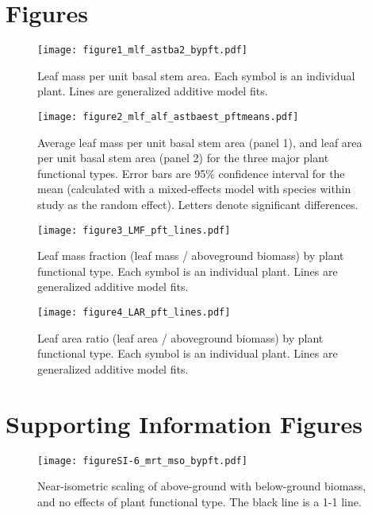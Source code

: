 \documentclass[a4paper]{article}\usepackage[]{graphicx}\usepackage[]{color}
\begin{document}
\clearpage
\section{Figures}


\begin{figure}[h!]
    \centering
    \texttt{[image: figure1\_mlf\_astba2\_bypft.pdf]}
    \caption{Leaf mass per unit basal stem area. Each symbol is an individual plant. Lines are generalized additive model fits.}
    \label{fig:figure1}
\end{figure}

\begin{figure}[h!]
    \centering
    \texttt{[image: figure2\_mlf\_alf\_astbaest\_pftmeans.pdf]}
    \caption{Average leaf mass per unit basal stem area (panel 1), and leaf area per unit basal stem area (panel 2) for the three major plant functional types. Error bars are 95\% confidence interval for the mean (calculated with a mixed-effects model with species within study as the random effect). Letters denote significant differences. }
    \label{fig:figure2}
\end{figure}


\begin{figure}[h!]
    \centering
    \texttt{[image: figure3\_LMF\_pft\_lines.pdf]}
    \caption{Leaf mass fraction (leaf mass / aboveground biomass) by plant functional type. Each symbol is an individual plant. Lines are generalized additive model fits.}
    \label{fig:figure3}
\end{figure}

\begin{figure}[h!]
    \centering
    \texttt{[image: figure4\_LAR\_pft\_lines.pdf]}
    \caption{Leaf area ratio (leaf area / aboveground biomass) by plant functional type. Each symbol is an individual plant. Lines are generalized additive model fits.}
    \label{fig:figure4}
\end{figure}


\clearpage
\section{Supporting Information Figures}

\begin{figure}[h!]
    \centering
    \texttt{[image: figureSI-6\_mrt\_mso\_bypft.pdf]}
    \caption{Near-isometric scaling of above-ground with below-ground biomass, and no effects of plant functional type. The black line is a 1-1 line.}
    \label{fig:figureSI6}
\end{figure}
\end{document}
